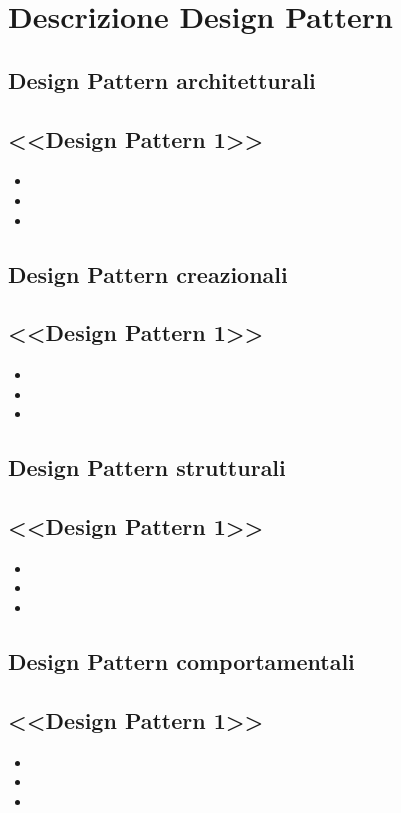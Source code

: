 \newpage
\appendix
\section{Descrizione Design Pattern} %

\subsection{Design Pattern architetturali} %
\subsection{<<Design Pattern 1>>} %
\begin{itemize}
\item {} 
\item {} 
\item {}
\end{itemize}

\subsection{Design Pattern creazionali} %
\subsection{<<Design Pattern 1>>} %
\begin{itemize}
\item {} 
\item {} 
\item {}
\end{itemize}

\subsection{Design Pattern strutturali} %
\subsection{<<Design Pattern 1>>} %
\begin{itemize}
\item {} 
\item {} 
\item {}
\end{itemize}

\subsection{Design Pattern comportamentali} %
\subsection{<<Design Pattern 1>>} %
\begin{itemize}
\item {} 
\item {} 
\item {}
\end{itemize}
